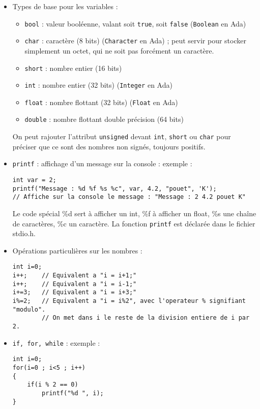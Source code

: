 \begin{itemize}
\item Types de base pour les variables :
	\begin{itemize}
	\item \lstinline{bool} : valeur booléenne, valant soit \lstinline{true}, soit \lstinline{false} (\lstinline{Boolean} en Ada)
	\item \lstinline{char} : caractère (8 bits) (\lstinline{Character} en Ada) ; peut servir pour stocker simplement un octet, qui ne soit pas forcément un caractère.
	\item \lstinline{short} : nombre entier (16 bits)
	\item \lstinline{int} : nombre entier (32 bits) (\lstinline{Integer} en Ada)
	\item \lstinline{float} : nombre flottant (32 bits) (\lstinline{Float} en Ada)
	\item \lstinline{double} : nombre flottant double précision (64 bits)\\
	\end{itemize}
On peut rajouter l'attribut \lstinline{unsigned} devant \lstinline{int}, \lstinline{short} ou \lstinline{char} pour préciser que ce sont des nombres non signés, toujours positifs.

\item \lstinline{printf} : affichage d'un message sur la console : exemple :\\
\begin{lstlisting}
int var = 2;
printf("Message : %d %f %s %c", var, 4.2, "pouet", 'K');
// Affiche sur la console le message : "Message : 2 4.2 pouet K"
\end{lstlisting}
Le code spécial \%d sert à afficher un int, \%f à afficher un float, \%s une chaîne de caractères, \%c un caractère. La fonction \lstinline{printf} est déclarée dans le fichier stdio.h.\\

\item Opérations particulières sur les nombres :
\begin{lstlisting}
int i=0;
i++;	// Equivalent a "i = i+1;"
i++;	// Equivalent a "i = i-1;"
i+=3;	// Equivalent a "i = i+3;"
i%=2;	// Equivalent a "i = i%2", avec l'operateur % signifiant "modulo".
		// On met dans i le reste de la division entiere de i par 2.
\end{lstlisting}

\item \lstinline{if, for, while} : exemple :\\
\begin{lstlisting}
int i=0;
for(i=0 ; i<5 ; i++)
{
	if(i % 2 == 0)
		printf("%d ", i);
}


\end{lstlisting}
\end{itemize}
